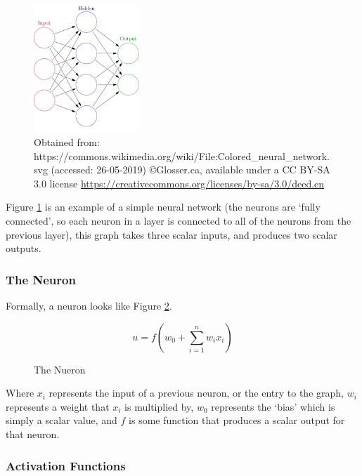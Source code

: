     \begin{figure}[h]
        \centering
        \includegraphics[width=150px]{../img/1000px-Colored_neural_network.png}
        \caption{Obtained from: https://commons.wikimedia.org/wiki/File:Colored\_neural\_network.svg (accessed: 26-05-2019) \copyright \space Glosser.ca, available under a CC BY-SA 3.0 license \url{https://creativecommons.org/licenses/by-sa/3.0/deed.en}}
        \label{fig:fcneuralnet}
    \end{figure}

    Figure \ref{fig:fcneuralnet} is an example of a simple neural network (the neurons are `fully connected', so each neuron in a layer is connected to all of the neurons from the previous layer), this graph takes three scalar inputs, and produces two scalar outputs.

        \subsubsection{The Neuron}
        Formally, a neuron looks like Figure \ref{fig:theneuron}.
        \begin{figure}[h]
        \[
            u=f(w_0+\sum_{i=1}^nw_ix_i)
        \]
        \caption{The Nueron}
        \label{fig:theneuron}
        \end{figure}
        Where $x_i$ represents the input of a previous neuron, or the entry to the graph, $w_i$ represents a weight that $x_i$ is multiplied by, $w_0$ represents the `bias' which is simply a scalar value, and $f$ is some function that produces a scalar output for that neuron.
        
        \subsubsection{Activation Functions}


